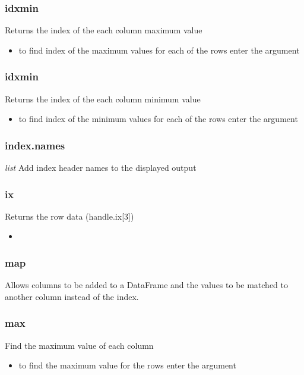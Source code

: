 %
\subsubsection{idxmin}
Returns the index of the each column maximum value
  \begin{itemize}

    \item to find index of the maximum values for each of the rows enter
      the argument \color{red}{axis=1}
  \end{itemize}

%
\subsubsection{idxmin}
Returns the index of the each column minimum value
  \begin{itemize}

    \item to find index of the minimum values for each of the rows enter
      the argument \color{red}{axis=1}
  \end{itemize}

%
\subsubsection{index.names}
\textit{list} Add index header names to the displayed output

%
\subsubsection{ix}
Returns the row data (handle.ix[3])
  \begin{itemize}

    \item \color{red}{if additional rows and columns are added using this
      command it will have the same effect as calling reindex.}
  \end{itemize}

%
\subsubsection{map}
Allows columns to be added to a DataFrame and the values to be matched to
another column instead of the index.

%
\subsubsection{max}
Find the maximum value of each column
  \begin{itemize}

    \item to find the maximum value for the rows enter the argument
      \color{red}{axis=1}
  \end{itemize}

